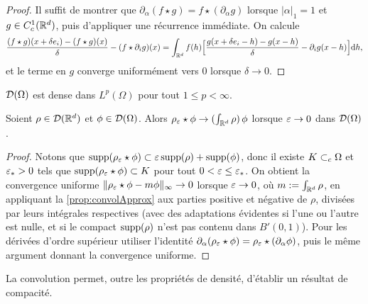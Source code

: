 \begin{proof}
	Il suffit de montrer que $\partial_\alpha (f\star g) = f \star (\partial_\alpha g)$ lorsque $|\alpha|_1 = 1$ et $g\in C^1_c(\mathbb{R}^d)$, puis d'appliquer une récurrence immédiate. 
	On calcule
\begin{equation*}
	\frac {(f\star g)(x+\delta e_i) - (f\star g) (x)} \delta - (f\star \partial_i g) (x) = \int_{\mathbb{R}^d} f(h) \Big[\frac{g(x+\delta e_i-h) - g(x-h)} \delta - \partial_i g(x-h)\Big] \mathrm{d} h,
\end{equation*}
et le terme en $g$ converge uniformément vers $0$ lorsque $\delta\to 0$. 
\end{proof}

\begin{corollary}
\label{corol:testDenseLp}
%
$\mathcal{D}(\Omega)$ est dense dans $L^p(\Omega)$ pour tout $1 \leq p < \infty$. 
\end{corollary}

\begin{corollary}
\label{corol:convolTestFun}
%
	Soient $\rho\in \mathcal{D}(\mathbb{R}^d)$ et $\phi \in \mathcal{D}(\Omega)$. 
	Alors $\rho_\varepsilon \star \phi \to  (\int_{\mathbb{R}^d} \rho)\, \phi$ lorsque $\varepsilon \to 0$ dans $\mathcal{D}(\Omega)$.
\end{corollary}

\begin{proof}
Notons que $\operatorname{supp}(\rho_\varepsilon \star \phi) \subset \varepsilon\operatorname{supp}(\rho) + \operatorname{supp}(\phi)$, donc il existe $K \subset_c \Omega$ et $\varepsilon_*>0$ tels que $\operatorname{supp}(\rho_\varepsilon \star \phi)\subset K$ pour tout $0 <\varepsilon \leq \varepsilon_*$. 
	On obtient la convergence uniforme $\|\rho_\varepsilon \star \phi - m \phi\|_\infty\to 0$ lorsque $\varepsilon \to 0$, où $m:=\int_{\mathbb{R}^d} \rho$, en appliquant la \cref{prop:convolApprox} aux parties positive et négative de $\rho$, divisées par leurs intégrales respectives (avec des adaptations évidentes si l'une ou l'autre est nulle, et si le compact $\operatorname{supp}(\rho)$ n'est pas contenu dans $B'(0,1)$). Pour les dérivées d'ordre supérieur utiliser l'identité $\partial_\alpha (\rho_\varepsilon \star \phi) = \rho_\varepsilon \star (\partial_\alpha \phi)$, puis le même argument donnant la convergence uniforme. 
\end{proof}


La convolution permet, outre les propriétés de densité, d'établir un résultat de compacité.

